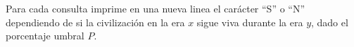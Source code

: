 \outputText

Para cada consulta imprime en una nueva linea el carácter ``S'' o ``N'' dependiendo de si la civilización en la era $x$ sigue viva durante la era $y$, dado el porcentaje umbral $P$.

\exampleCases

\begin{example}
\end{example}

